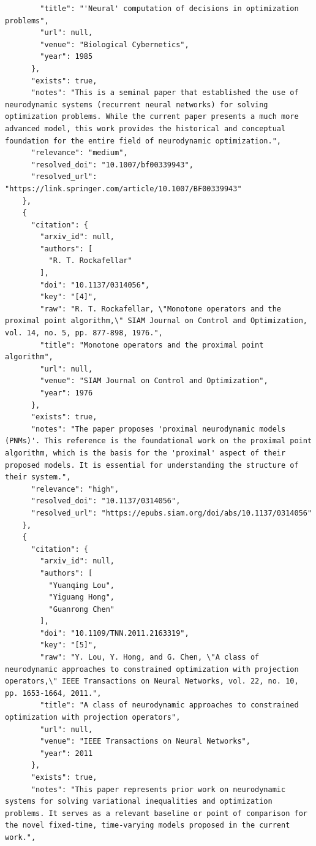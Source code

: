 \documentclass[11pt]{article}
\begin{document}
\begin{verbatim}
        "title": "'Neural' computation of decisions in optimization problems",
        "url": null,
        "venue": "Biological Cybernetics",
        "year": 1985
      },
      "exists": true,
      "notes": "This is a seminal paper that established the use of neurodynamic systems (recurrent neural networks) for solving optimization problems. While the current paper presents a much more advanced model, this work provides the historical and conceptual foundation for the entire field of neurodynamic optimization.",
      "relevance": "medium",
      "resolved_doi": "10.1007/bf00339943",
      "resolved_url": "https://link.springer.com/article/10.1007/BF00339943"
    },
    {
      "citation": {
        "arxiv_id": null,
        "authors": [
          "R. T. Rockafellar"
        ],
        "doi": "10.1137/0314056",
        "key": "[4]",
        "raw": "R. T. Rockafellar, \"Monotone operators and the proximal point algorithm,\" SIAM Journal on Control and Optimization, vol. 14, no. 5, pp. 877-898, 1976.",
        "title": "Monotone operators and the proximal point algorithm",
        "url": null,
        "venue": "SIAM Journal on Control and Optimization",
        "year": 1976
      },
      "exists": true,
      "notes": "The paper proposes 'proximal neurodynamic models (PNMs)'. This reference is the foundational work on the proximal point algorithm, which is the basis for the 'proximal' aspect of their proposed models. It is essential for understanding the structure of their system.",
      "relevance": "high",
      "resolved_doi": "10.1137/0314056",
      "resolved_url": "https://epubs.siam.org/doi/abs/10.1137/0314056"
    },
    {
      "citation": {
        "arxiv_id": null,
        "authors": [
          "Yuanqing Lou",
          "Yiguang Hong",
          "Guanrong Chen"
        ],
        "doi": "10.1109/TNN.2011.2163319",
        "key": "[5]",
        "raw": "Y. Lou, Y. Hong, and G. Chen, \"A class of neurodynamic approaches to constrained optimization with projection operators,\" IEEE Transactions on Neural Networks, vol. 22, no. 10, pp. 1653-1664, 2011.",
        "title": "A class of neurodynamic approaches to constrained optimization with projection operators",
        "url": null,
        "venue": "IEEE Transactions on Neural Networks",
        "year": 2011
      },
      "exists": true,
      "notes": "This paper represents prior work on neurodynamic systems for solving variational inequalities and optimization problems. It serves as a relevant baseline or point of comparison for the novel fixed-time, time-varying models proposed in the current work.",

\end{verbatim}
\end{document}
